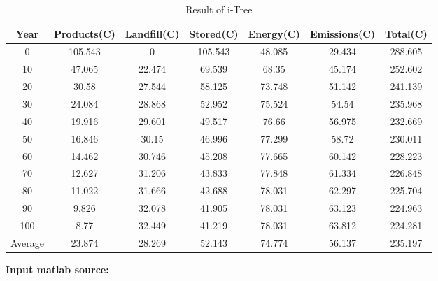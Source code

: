 \documentclass{mcmthesis}
\numberwithin{figure}{section}
\numberwithin{table}{section}
\numberwithin{equation}{section}
\begin{document}
\begin{appendices}
\begin{table}[ht]
  \caption{Result of i-Tree}\label{iTree}
  \begin{tabular}{
  >{\columncolor[HTML]{FFFFFF}}c |
  >{\columncolor[HTML]{FFFFFF}}c 
  >{\columncolor[HTML]{FFFFFF}}c 
  >{\columncolor[HTML]{FFFFFF}}c 
  >{\columncolor[HTML]{FFFFFF}}c 
  >{\columncolor[HTML]{FFFFFF}}c 
  >{\columncolor[HTML]{FFFFFF}}c }
  \textbf{Year} & \textbf{Products(C)} & \textbf{Landfill(C)} & \textbf{Stored(C)} & \textbf{Energy(C)} & \textbf{Emissions(C)} & \textbf{Total(C)} \\ \hline
  0       & 105.543 & 0      & 105.543 & 48.085 & 29.434 & 288.605 \\
  10      & 47.065  & 22.474 & 69.539  & 68.35  & 45.174 & 252.602 \\
  20      & 30.58   & 27.544 & 58.125  & 73.748 & 51.142 & 241.139 \\
  30      & 24.084  & 28.868 & 52.952  & 75.524 & 54.54  & 235.968 \\
  40      & 19.916  & 29.601 & 49.517  & 76.66  & 56.975 & 232.669 \\
  50      & 16.846  & 30.15  & 46.996  & 77.299 & 58.72  & 230.011 \\
  60      & 14.462  & 30.746 & 45.208  & 77.665 & 60.142 & 228.223 \\
  70      & 12.627  & 31.206 & 43.833  & 77.848 & 61.334 & 226.848 \\
  80      & 11.022  & 31.666 & 42.688  & 78.031 & 62.297 & 225.704 \\
  90      & 9.826   & 32.078 & 41.905  & 78.031 & 63.123 & 224.963 \\
  100     & 8.77    & 32.449 & 41.219  & 78.031 & 63.812 & 224.281 \\
  Average & 23.874  & 28.269 & 52.143  & 74.774 & 56.137 & 235.197
  \end{tabular}
  \end{table}

\textbf{\textcolor[rgb]{0.98,0.00,0.00}{Input matlab source:}}



\end{appendices}
\end{document}
